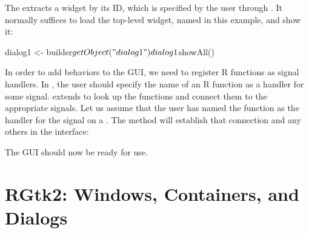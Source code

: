 The  extracts a widget by its ID, which
is specified by the user through . It normally
suffices to load the top-level widget, named  in this
example, and show it:
\begin{Schunk}
\begin{Sinput}
 dialog1 <- builder$getObject("dialog1")
 dialog1$showAll()
\end{Sinput}
\end{Schunk}

In order to add behaviors to the GUI, we need to register R functions
as signal handlers. In , the user should specify the
name of an R function as a handler for some signal. 
extends  to look up the functions and connect them
to the appropriate signals. Let us assume that the user has named the
 function as the handler for the
 signal on a . The
 method will establish that
connection and any others in the interface:
\begin{Schunk}
\end{Schunk}
% 
The GUI should now be ready for use.






\chapter{RGtk2: Windows, Containers, and Dialogs}
\label{sec:top-level-windows}




